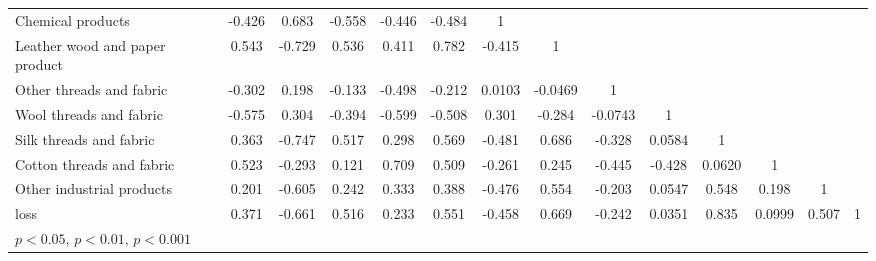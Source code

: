 {\begin{tabular}{l*{13}{c}}
Chemical products&   -0.426\sym{**} &    0.683\sym{***}&   -0.558\sym{***}&   -0.446\sym{***}&   -0.484\sym{***}&        1         &                  &                  &                  &                  &                  &                  &                  \\
Leather wood and paper product&    0.543\sym{***}&   -0.729\sym{***}&    0.536\sym{***}&    0.411\sym{**} &    0.782\sym{***}&   -0.415\sym{**} &        1         &                  &                  &                  &                  &                  &                  \\
Other threads and fabric&   -0.302\sym{*}  &    0.198         &   -0.133         &   -0.498\sym{***}&   -0.212         &   0.0103         &  -0.0469         &        1         &                  &                  &                  &                  &                  \\
Wool threads and fabric&   -0.575\sym{***}&    0.304\sym{*}  &   -0.394\sym{**} &   -0.599\sym{***}&   -0.508\sym{***}&    0.301\sym{*}  &   -0.284\sym{*}  &  -0.0743         &        1         &                  &                  &                  &                  \\
Silk threads and fabric&    0.363\sym{**} &   -0.747\sym{***}&    0.517\sym{***}&    0.298\sym{*}  &    0.569\sym{***}&   -0.481\sym{***}&    0.686\sym{***}&   -0.328\sym{*}  &   0.0584         &        1         &                  &                  &                  \\
Cotton threads and fabric&    0.523\sym{***}&   -0.293\sym{*}  &    0.121         &    0.709\sym{***}&    0.509\sym{***}&   -0.261         &    0.245         &   -0.445\sym{***}&   -0.428\sym{**} &   0.0620         &        1         &                  &                  \\
Other industrial products&    0.201         &   -0.605\sym{***}&    0.242         &    0.333\sym{*}  &    0.388\sym{**} &   -0.476\sym{***}&    0.554\sym{***}&   -0.203         &   0.0547         &    0.548\sym{***}&    0.198         &        1         &                  \\
loss            &    0.371\sym{**} &   -0.661\sym{***}&    0.516\sym{***}&    0.233         &    0.551\sym{***}&   -0.458\sym{***}&    0.669\sym{***}&   -0.242         &   0.0351         &    0.835\sym{***}&   0.0999         &    0.507\sym{***}&        1         \\
\hline\hline
\multicolumn{14}{l}{\footnotesize \sym{*} \(p<0.05\), \sym{**} \(p<0.01\), \sym{***} \(p<0.001\)}\\
\end{tabular}
}
